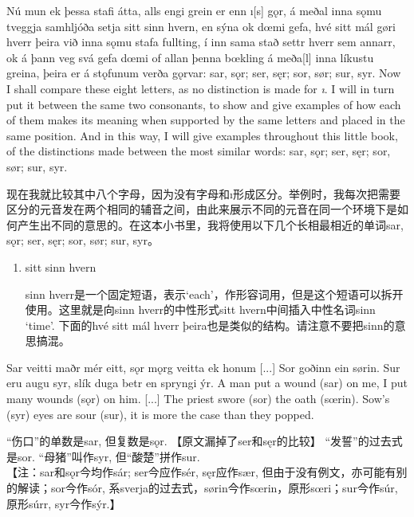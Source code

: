 \begin{paracol}{2}
    Nú mun ek þessa stafi átta, alls engi grein er enn ı[s] gǫr, á meðal inna sǫmu tveggja samhljóða setja sitt sinn hvern, en sýna ok dœmi gefa, hvé sitt mál gøri hverr þeira við inna sǫmu stafa fullting, í inn sama stað settr hverr sem annarr, ok á þann veg svá gefa dœmi of allan þenna bœkling á meða[l] inna líkustu greina, þeira er á stǫfunum verða gǫrvar: sar, sǫr; ser, sęr; sor, sør; sur, syr.
    \switchcolumn
    Now I shall compare these eight letters, as no distinction is made for \textit{ı}. I will in turn put it between the same two consonants, to show and give examples of how each of them makes its meaning when supported by the same letters and placed in the same position. And in this way, I will give examples throughout this little book, of the distinctions made between the most similar words: sar, sǫr; ser, sęr; sor, sør; sur, syr.
\end{paracol}
\begin{translation*}{}
    现在我就比较其中八个字母，因为没有字母和ı形成区分。举例时，我每次把需要区分的元音发在两个相同的辅音之间，由此来展示不同的元音在同一个环境下是如何产生出不同的意思的。在这本小书里，我将使用以下几个长相最相近的单词sar, sǫr; ser, sęr; sor, sør; sur, syr。
\end{translation*}
\begin{grammar*}{}
    \begin{enumerate}[leftmargin=*]
        \item sitt sinn hvern

              sinn hverr是一个固定短语，表示`each'，作形容词用，但是这个短语可以拆开使用。这里就是向sinn hverr的中性形式sitt hvern中间插入中性名词sinn `time'. 下面的hvé sitt mál hverr þeira也是类似的结构。请注意不要把sinn的意思搞混。
    \end{enumerate}
\end{grammar*}
\begin{paracol}{2}
    Sar veitti maðr mér eitt, sǫr mǫrg veitta ek honum [...] Sor goðinn ein sørin. Sur eru augu syr, slík duga betr en spryngi ýr.
    \switchcolumn
    A man put a wound (sar) on me, I put many wounds (sǫr) on him. [...] The priest swore (sor) the oath (sœrin). Sow's (syr) eyes are sour (sur), it is more the case than they popped.
\end{paracol}
\begin{translation*}{}
    “伤口”的单数是sar, 但复数是sǫr. 【原文漏掉了ser和sęr的比较】 “发誓”的过去式是sor. “母猪”叫作syr, 但“酸楚”拼作sur.\\

    【注：sar和sǫr今均作sár; ser今应作sér, sęr应作sær, 但由于没有例文，亦可能有别的解读；sor今作sór, 系sverja的过去式，sørin今作sœrin，原形sœri；sur今作súr, 原形súrr, syr今作sýr.】
\end{translation*}

